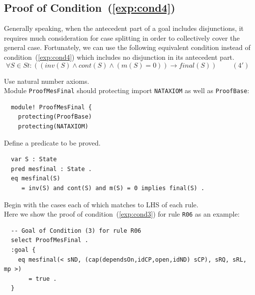 \documentclass[12pt]{report}
\newcommand{\ra}{\rightarrow}
\begin{document}
\subsection{Proof of Condition~(\ref{exp:cond4})}
\label{sec:TOSCAmesfinal}
Generally speaking, when the antecedent part of a goal includes
disjunctions, it requires much consideration for case splitting in
order to collectively cover the general case. Fortunately, we can use
the following equivalent condition instead of
condition~(\ref{exp:cond4}) which includes no disjunction in its
antecedent part.
\[\forall S\in St:((inv(S)\land cont(S)\land(m(S) = 0))
  \ra final(S))~~~~~~~~~~(4')\]
  
 Use natural number axioms. \\
Module {\tt ProofMesFinal} should protecting import {\tt NATAXIOM} as
well as {\tt ProofBase}:
\small
\begin{verbatim}
  module! ProofMesFinal {
    protecting(ProofBase)
    protecting(NATAXIOM)
\end{verbatim}
\normalsize

 Define a predicate to be proved.
\small
\begin{verbatim}
  var S : State
  pred mesfinal : State .
  eq mesfinal(S)
     = inv(S) and cont(S) and m(S) = 0 implies final(S) .
\end{verbatim}
\normalsize

 Begin with the cases each of which matches to
LHS of each rule. \\ 
Here we show the proof of condition~(\ref{exp:cond3}) for rule {\tt R06}
as an example:
\small
\begin{verbatim}
  -- Goal of Condition (3) for rule R06
  select ProofMesFinal .
  :goal {
    eq mesfinal(< sND, (cap(dependsOn,idCP,open,idND) sCP), sRQ, sRL, mp >)
       = true .
  }
\end{verbatim}
\normalsize
\end{document}
